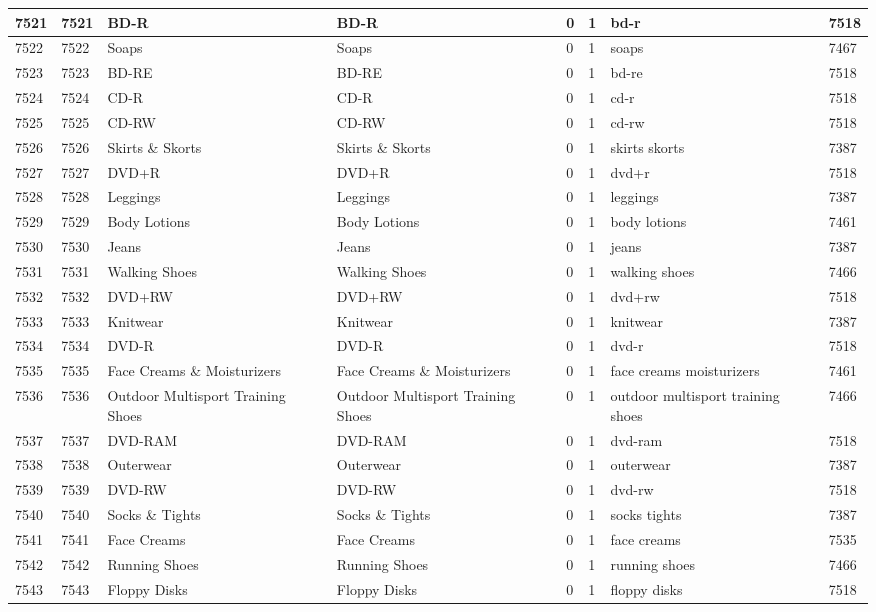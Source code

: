 \begin{longtable}{|l|l|l|l|l|l|l|l|}
7521 & 7521 & BD-R & BD-R & 0 & 1 & bd-r & 7518 \\ \hline 
7522 & 7522 & Soaps & Soaps & 0 & 1 & soaps & 7467 \\ \hline 
7523 & 7523 & BD-RE & BD-RE & 0 & 1 & bd-re & 7518 \\ \hline 
7524 & 7524 & CD-R & CD-R & 0 & 1 & cd-r & 7518 \\ \hline 
7525 & 7525 & CD-RW & CD-RW & 0 & 1 & cd-rw & 7518 \\ \hline 
7526 & 7526 & Skirts \& Skorts & Skirts \& Skorts & 0 & 1 & skirts skorts & 7387 \\ \hline 
7527 & 7527 & DVD+R & DVD+R & 0 & 1 & dvd+r & 7518 \\ \hline 
7528 & 7528 & Leggings & Leggings & 0 & 1 & leggings & 7387 \\ \hline 
7529 & 7529 & Body Lotions & Body Lotions & 0 & 1 & body lotions & 7461 \\ \hline 
7530 & 7530 & Jeans & Jeans & 0 & 1 & jeans & 7387 \\ \hline 
7531 & 7531 & Walking Shoes & Walking Shoes & 0 & 1 & walking shoes & 7466 \\ \hline 
7532 & 7532 & DVD+RW & DVD+RW & 0 & 1 & dvd+rw & 7518 \\ \hline 
7533 & 7533 & Knitwear & Knitwear & 0 & 1 & knitwear & 7387 \\ \hline 
7534 & 7534 & DVD-R & DVD-R & 0 & 1 & dvd-r & 7518 \\ \hline 
7535 & 7535 & Face Creams \& Moisturizers & Face Creams \& Moisturizers & 0 & 1 & face creams moisturizers & 7461 \\ \hline 
7536 & 7536 & Outdoor Multisport Training Shoes & Outdoor Multisport Training Shoes & 0 & 1 & outdoor multisport training shoes & 7466 \\ \hline 
7537 & 7537 & DVD-RAM & DVD-RAM & 0 & 1 & dvd-ram & 7518 \\ \hline 
7538 & 7538 & Outerwear & Outerwear & 0 & 1 & outerwear & 7387 \\ \hline 
7539 & 7539 & DVD-RW & DVD-RW & 0 & 1 & dvd-rw & 7518 \\ \hline 
7540 & 7540 & Socks \& Tights & Socks \& Tights & 0 & 1 & socks tights & 7387 \\ \hline 
7541 & 7541 & Face Creams & Face Creams & 0 & 1 & face creams & 7535 \\ \hline 
7542 & 7542 & Running Shoes & Running Shoes & 0 & 1 & running shoes & 7466 \\ \hline 
7543 & 7543 & Floppy Disks & Floppy Disks & 0 & 1 & floppy disks & 7518 \\ \hline 

\end{longtable}

